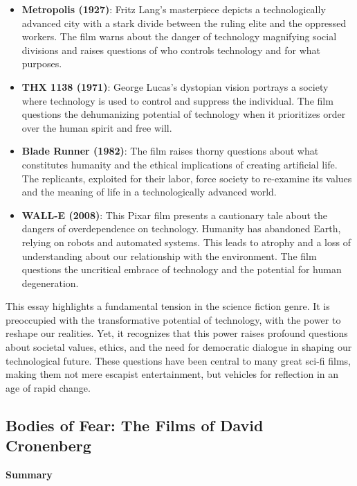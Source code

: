 \documentclass[11pt,fleqn]{book}
\begin{document}
\begin{itemize}
\item \textbf{Metropolis (1927)}:  Fritz Lang's masterpiece depicts a technologically advanced city with a stark divide between the ruling elite and the oppressed workers. The film warns about the danger of technology magnifying social divisions and raises questions of who controls technology and for what purposes.

\item \textbf{THX 1138 (1971)}: George Lucas's dystopian vision portrays a society where technology is used to control and suppress the individual. The film questions the dehumanizing potential of technology when it prioritizes order over the human spirit and free will.

\item \textbf{Blade Runner (1982)}: The film raises thorny questions about what constitutes humanity and the ethical implications of creating artificial life. The replicants, exploited for their labor, force society to re-examine its values and the meaning of life in a technologically advanced world.

\item \textbf{WALL-E (2008)}: This Pixar film presents a cautionary tale about the dangers of overdependence on technology.  Humanity has abandoned Earth, relying on robots and automated systems. This leads to atrophy and a loss of understanding about our relationship with the environment. The film questions the uncritical embrace of technology and the potential for human degeneration.
\end{itemize}
\vspace{5pt}

This essay highlights a fundamental tension in the science fiction genre. It is preoccupied with the transformative potential of technology, with the power to reshape our realities. Yet, it recognizes that this power raises profound questions about societal values, ethics, and the need for democratic dialogue in shaping our technological future.  These questions have been central to many great sci-fi films, making them not mere escapist entertainment, but vehicles for reflection in an age of rapid change.


\subsection{Bodies of Fear: The Films of David Cronenberg}
\textbf{Summary}
\end{document}
